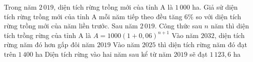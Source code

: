 \begin{ex}%
	Trong năm $2\,019$, diện tích rừng trồng mới của tỉnh A là $1\,000$ ha. Giả sử diện tích rừng trồng mới của tỉnh A mỗi năm tiếp theo đều tăng $6$\% so với diện tích rừng trồng mới  của năm liền trước. Sau năm $2\,019$.
	\choiceTF 
		{Công thức sau $n$ năm  thì diện tích trồng rừng của tỉnh A là $ A=1000\left(1+0{,}06\right)^{n+1}$}
		{\True Vào năm $2032$, diện tích rừng năm đó hơn gấp  đôi năm $2019$}
		{\True Vào năm $2025$ thì diện tích rừng  năm đó đạt trên $1\,400$ ha}
		{\True  Diện tích rừng vào hai năm sau kể từ năm $2019$ sẽ đạt $1\,123{,}6$ ha}
\end{ex}

